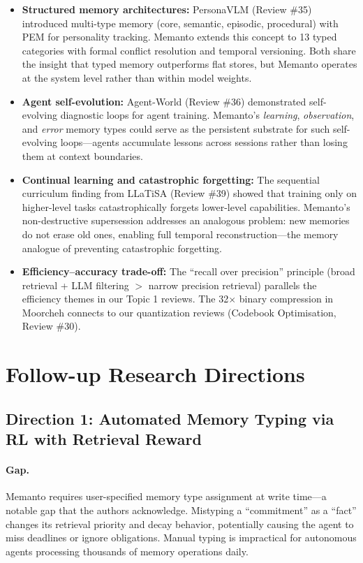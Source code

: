 \documentclass[11pt]{article}
\begin{document}
\begin{itemize}
    \item \textbf{Structured memory architectures:} PersonaVLM (Review \#35) introduced multi-type memory (core, semantic, episodic, procedural) with PEM for personality tracking. Memanto extends this concept to 13 typed categories with formal conflict resolution and temporal versioning. Both share the insight that typed memory outperforms flat stores, but Memanto operates at the system level rather than within model weights.
    \item \textbf{Agent self-evolution:} Agent-World (Review \#36) demonstrated self-evolving diagnostic loops for agent training. Memanto's \emph{learning}, \emph{observation}, and \emph{error} memory types could serve as the persistent substrate for such self-evolving loops---agents accumulate lessons across sessions rather than losing them at context boundaries.
    \item \textbf{Continual learning and catastrophic forgetting:} The sequential curriculum finding from LLaTiSA (Review \#39) showed that training only on higher-level tasks catastrophically forgets lower-level capabilities. Memanto's non-destructive supersession addresses an analogous problem: new memories do not erase old ones, enabling full temporal reconstruction---the memory analogue of preventing catastrophic forgetting.
    \item \textbf{Efficiency--accuracy trade-off:} The ``recall over precision'' principle (broad retrieval + LLM filtering $>$ narrow precision retrieval) parallels the efficiency themes in our Topic 1 reviews. The 32$\times$ binary compression in Moorcheh connects to our quantization reviews (Codebook Optimisation, Review \#30).
\end{itemize}

\section{Follow-up Research Directions}

\subsection{Direction 1: Automated Memory Typing via RL with Retrieval Reward}

\paragraph{Gap.}
Memanto requires user-specified memory type assignment at write time---a notable gap that the authors acknowledge. Mistyping a ``commitment'' as a ``fact'' changes its retrieval priority and decay behavior, potentially causing the agent to miss deadlines or ignore obligations. Manual typing is impractical for autonomous agents processing thousands of memory operations daily.
\end{document}
